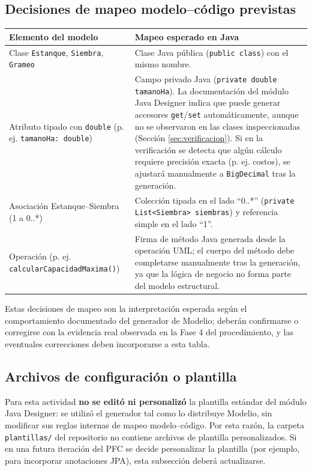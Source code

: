 \documentclass[11pt,a4paper]{article}
\begin{document}
\subsection{Decisiones de mapeo modelo--código previstas}
\begin{center}
\begin{tabularx}{\linewidth}{>{\raggedright\arraybackslash}p{5cm}X}
\toprule
\textbf{Elemento del modelo} & \textbf{Mapeo esperado en Java} \\
\midrule
Clase \texttt{Estanque}, \texttt{Siembra}, \texttt{Grameo} & Clase Java pública
(\texttt{public class}) con el mismo nombre. \\
Atributo tipado con \texttt{double} (p. ej. \texttt{tamanoHa: double}) & Campo
privado Java (\texttt{private double tamanoHa}). La documentación del módulo
Java Designer indica que puede generar accesores \texttt{get}/\texttt{set}
automáticamente, aunque no se observaron en las clases inspeccionadas (Sección
\ref{sec:verificacion}). Si en la verificación se detecta que algún cálculo
requiere precisión exacta (p. ej. costos), se ajustará manualmente a
\texttt{BigDecimal} tras la generación. \\
Asociación Estanque--Siembra (1 a 0..*) & Colección tipada en el lado ``0..*''
(\texttt{private List<Siembra> siembras}) y referencia simple en el lado ``1''. \\
Operación (p. ej. \texttt{calcularCapacidadMaxima()}) & Firma de método Java
generada desde la operación UML; el cuerpo del método debe completarse manualmente
tras la generación, ya que la lógica de negocio no forma parte del modelo
estructural. \\
\bottomrule
\end{tabularx}
\end{center}

Estas decisiones de mapeo son la interpretación esperada según el comportamiento
documentado del generador de Modelio; deberán confirmarse o corregirse con la
evidencia real observada en la Fase 4 del procedimiento, y las eventuales
correcciones deben incorporarse a esta tabla.

\subsection{Archivos de configuración o plantilla}
Para esta actividad \textbf{no se editó ni personalizó} la plantilla estándar
del módulo Java Designer: se utilizó el generador tal como lo distribuye
Modelio, sin modificar sus reglas internas de mapeo modelo--código. Por esta
razón, la carpeta \texttt{plantillas/} del repositorio no contiene archivos de
plantilla personalizados. Si en una futura iteración del PFC se decide
personalizar la plantilla (por ejemplo, para incorporar anotaciones JPA), esta
subsección deberá actualizarse.
\end{document}
